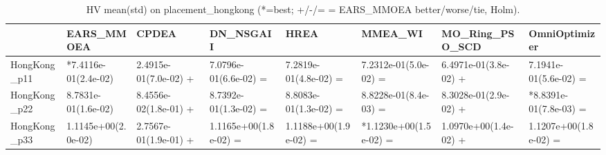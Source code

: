 \begin{table}[t]
\centering
\caption{HV mean(std) on placement_hongkong (*=best; +/-/= = EARS_MMOEA better/worse/tie, Holm).}
\label{tab:placement_hongkong_HV}
\begin{tabular}{llllllll}
\toprule
 & EARS\_MMOEA & CPDEA & DN\_NSGAII & HREA & MMEA\_WI & MO\_Ring\_PSO\_SCD & OmniOptimizer \\
\midrule
HongKong\_p11 & *7.4116e-01(2.4e-02) & 2.4915e-01(7.0e-02) + & 7.0796e-01(6.6e-02) = & 7.2819e-01(4.8e-02) = & 7.2312e-01(5.0e-02) = & 6.4971e-01(3.8e-02) + & 7.1941e-01(5.6e-02) = \\
HongKong\_p22 & 8.7831e-01(1.6e-02) & 8.4556e-02(1.8e-01) + & 8.7392e-01(1.3e-02) = & 8.8083e-01(1.3e-02) = & 8.8228e-01(8.4e-03) = & 8.3028e-01(2.9e-02) + & *8.8391e-01(7.8e-03) = \\
HongKong\_p33 & 1.1145e+00(2.0e-02) & 2.7567e-01(1.9e-01) + & 1.1165e+00(1.8e-02) = & 1.1188e+00(1.9e-02) = & *1.1230e+00(1.5e-02) = & 1.0970e+00(1.4e-02) + & 1.1207e+00(1.8e-02) = \\
\bottomrule
\end{tabular}
\end{table}

